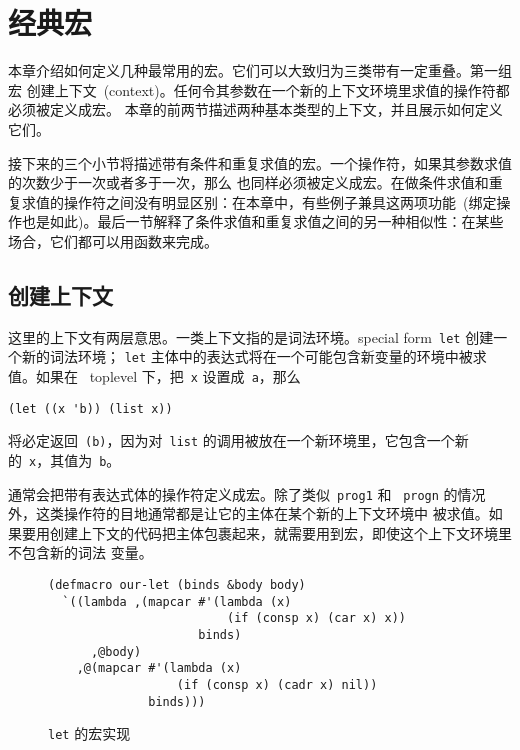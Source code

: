 
\chapter{经典宏}
\label{chap:classic_macros}

本章介绍如何定义几种最常用的宏。它们可以大致归为三类\pozhehao{}带有一定重叠。第一组宏
创建上下文~(context)。任何令其参数在一个新的上下文环境里求值的操作符都必须被定义成宏。
本章的前两节描述两种基本类型的上下文，并且展示如何定义它们。

接下来的三个小节将描述带有条件和重复求值的宏。一个操作符，如果其参数求值的次数少于一次或者多于一次，那么
也同样必须被定义成宏。在做条件求值和重复求值的操作符之间没有明显区别：在本章中，有些例子兼具这两项功能~(绑定操作也是如此)。最后一节解释了条件求值和重复求值之间的另一种相似性：在某些
场合，它们都可以用函数来完成。
\section{创建上下文}
\label{sec:creating_context}

这里的上下文有两层意思。一类上下文指的是词法环境。special form~\texttt{let} 创建一个新的词法环境；
\texttt{let} 主体中的表达式将在一个可能包含新变量的环境中被求值。如果在
~toplevel 下，把~\texttt{x} 设置成~\texttt{a}，那么
\begin{lstlisting}
(let ((x 'b)) (list x))
\end{lstlisting}
将必定返回~\verb|(b)|，因为对~\verb|list| 的调用被放在一个新环境里，它包含一个新
的~\verb|x|，其值为~\verb|b|。

通常会把带有表达式体的操作符定义成宏。除了类似~\verb|prog1| 和
~\verb|progn| 的情况外，这类操作符的目地通常都是让它的主体在某个新的上下文环境中
被求值。如果要用创建上下文的代码把主体包裹起来，就需要用到宏，即使这个上下文环境里不包含新的词法
变量。

\begin{figure}
\begin{lstlisting}
(defmacro our-let (binds &body body)
  `((lambda ,(mapcar #'(lambda (x)
                         (if (consp x) (car x) x))
                     binds)
      ,@body)
    ,@(mapcar #'(lambda (x)
                  (if (consp x) (cadr x) nil))
              binds)))
\end{lstlisting}
  \caption{\texttt{let} 的宏实现}
  \label{fig:macro_implementation_of_let}
\end{figure}

